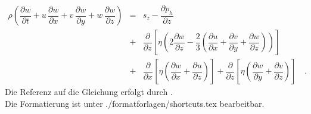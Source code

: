 \begin{eqnarray}
  \rho \left( \dfrac{\partial w}{\partial t} + u\, \dfrac{\partial w}{\partial x}
                                             + v\, \dfrac{\partial w}{\partial y}
                                             + w\, \dfrac{\partial w}{\partial z} \right)
  & = & s_z - \dfrac{\partial p_h}{\partial z} \nonumber \\
  & + & \dfrac{\partial}{\partial z} \left[ \eta \left( 2 \dfrac{\partial w}{\partial z}
                                                        - \dfrac{2}{3} \left( \dfrac{\partial u}{\partial x}
                                                                            + \dfrac{\partial v}{\partial y}
                                                                            + \dfrac{\partial w}{\partial z}\right) \right) \right] \nonumber \\
  & + & \dfrac{\partial}{\partial x} \left[ \eta \left( \dfrac{\partial w}{\partial x}
                                                      + \dfrac{\partial u}{\partial z} \right) \right]
      + \dfrac{\partial}{\partial z} \left[ \eta \left( \dfrac{\partial w}{\partial y}
                                                      + \dfrac{\partial v}{\partial z} \right) \right] \nonumber\quad.
\end{eqnarray}
%
Die Referenz auf die Gleichung erfolgt durch .\\
Die Formatierung ist unter ./formatforlagen/shortcuts.tex bearbeitbar.
%
\newpage
%

